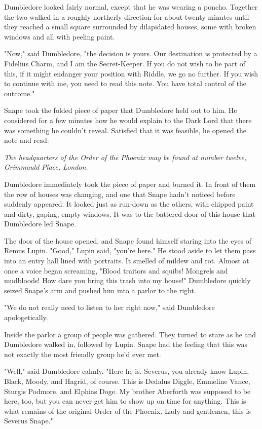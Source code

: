 Dumbledore looked fairly normal, except that he was wearing a poncho. Together the two walked in a roughly northerly direction for about twenty minutes until they reached a small square surrounded by dilapidated houses, some with broken windows and all with peeling paint.

"Now," said Dumbledore, "the decision is yours. Our destination is protected by a Fidelius Charm, and I am the Secret-Keeper. If you do not wish to be part of this, if it might endanger your position with Riddle, we go no further. If you wish to continue with me, you need to read this note. You have total control of the outcome."

Snape took the folded piece of paper that Dumbledore held out to him. He considered for a few minutes how he would explain to the Dark Lord that there was something he couldn't reveal. Satisfied that it was feasible, he opened the note and read:

\emph{The headquarters of the Order of the Phoenix may be found at number twelve, Grimmauld Place, London.}

Dumbledore immediately took the piece of paper and burned it. In front of them the row of houses was changing, and one that Snape hadn't noticed before suddenly appeared. It looked just as run-down as the others, with chipped paint and dirty, gaping, empty windows. It was to the battered door of this house that Dumbledore led Snape.

The door of the house opened, and Snape found himself staring into the eyes of Remus Lupin. "Good," Lupin said, "you're here." He stood aside to let them pass into an entry hall lined with portraits. It smelled of mildew and rot. Almost at once a voice began screaming, "Blood traitors and squibs! Mongrels and mudbloods! How dare you bring this trash into my house!" Dumbledore quickly seized Snape's arm and pushed him into a parlor to the right.

"We do not really need to listen to her right now," said Dumbledore apologetically.

Inside the parlor a group of people was gathered. They turned to stare as he and Dumbledore walked in, followed by Lupin. Snape had the feeling that this was not exactly the most friendly group he'd ever met.

"Well," said Dumbledore calmly. "Here he is. Severus, you already know Lupin, Black, Moody, and Hagrid, of course. This is Dedalus Diggle, Emmeline Vance, Sturgis Podmore, and Elphias Doge. My brother Aberforth was supposed to be here, too, but you can never get him to show up on time for anything. This is what remains of the original Order of the Phoenix. Lady and gentlemen, this is Severus Snape."

